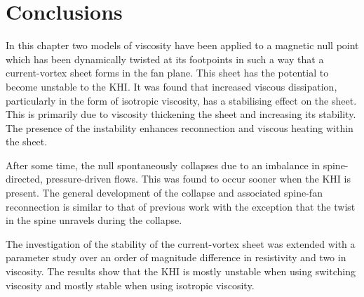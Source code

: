 \section{Conclusions}
\label{sec:khi_conclusions}

In this chapter two models of viscosity have been applied to a magnetic null point which has been dynamically twisted at its footpoints in such a way that a current-vortex sheet forms in the fan plane. This sheet has the potential to become unstable to the KHI. It was found that increased viscous dissipation, particularly in the form of isotropic viscosity, has a stabilising effect on the sheet. This is primarily due to viscosity thickening the sheet and increasing its stability. The presence of the instability enhances reconnection and viscous heating within the sheet.

After some time, the null spontaneously collapses due to an imbalance in spine-directed, pressure-driven flows. This was found to occur sooner when the KHI is present. The general development of the collapse and associated spine-fan reconnection is similar to that of previous work with the exception that the twist in the spine unravels during the collapse.

The investigation of the stability of the current-vortex sheet was extended with a parameter study over an order of magnitude difference in resistivity and two in viscosity. The results show that the KHI is mostly unstable when using switching viscosity and mostly stable when using isotropic viscosity.
